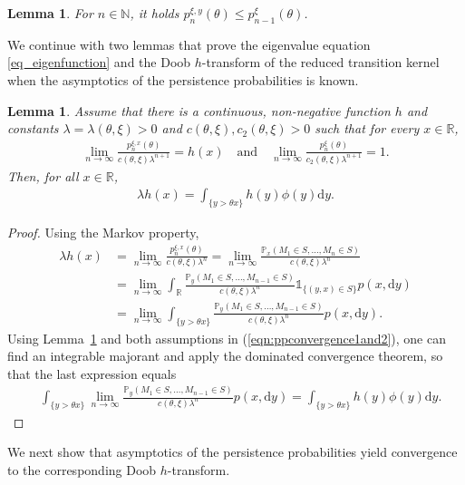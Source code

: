 \documentclass[12pt]{article}
\newcommand{\N}{\mathbb{N}} %
\newcommand{\R}{\mathbb{R}} %
\renewcommand{\P}{\mathbb{P}} %
\newcommand{\1}{\mathds{1}}
\renewcommand{\d}{\mathrm{d}}
\theoremstyle{definition}
\theoremstyle{plain}
\newtheorem{Lemma}[definition]{Lemma}
\theoremstyle{remark}
\begin{document}
\begin{Lemma}\label{estimate_Px}
For $n\in\N$, it holds 
$p_n^{\xi,y}(\theta)\le p_{n-1}^{\xi}(\theta)$.
\end{Lemma}
We continue with two lemmas that prove the eigenvalue equation \eqref{eq_eigenfunction} and the Doob $h$-transform of the reduced transition kernel when the asymptotics of the persistence probabilities is known.
\begin{Lemma}\label{eigenfunction_lemma}
  Assume that there is a continuous, non-negative function $h$ and constants $\lambda=\lambda(\theta,\xi)>0$ and $c(\theta,\xi),c_2(\theta,\xi)>0$ such that for  every $x\in\R$,
    \begin{align} \label{eqn:ppconvergence1and2}
        \lim_{n\to\infty}\frac{p_n^{\xi,x}(\theta)}{c(\theta,\xi)\lambda^{n+1}}= h(x)
   \quad\text{and}\quad
       \lim_{n\to\infty}\frac{p_n^{\xi}(\theta)}{c_2(\theta,\xi)\lambda^{n+1}}=1.
    \end{align}
 Then, for all $x\in\R$,
 \begin{align*}
     \lambda h(x)=\int_{\{y>\theta x\}}h(y)\phi(y)\d y.
 \end{align*}
\end{Lemma}
\begin{proof}
Using the Markov property,
  \begin{align*}
   \lambda h(x)&= \lim_{n\to\infty}\frac{p_n^{\xi,x}(\theta)}{c(\theta,\xi)\lambda ^n}
      =\lim_{n\to\infty}\frac{\P_x(M_1\in S,\dots,M_n\in S)}{c(\theta,\xi)\lambda ^n}
      \\&=\lim_{n\to\infty}\int_\R\frac{\P_y(M_1\in S,\dots,M_{n-1}\in S)}{c(\theta,\xi)\lambda ^n}\1_{\{(y,x)\in S\}}p(x,\d y)
      \\&=\lim_{n\to\infty}\int_{\{y>\theta x\}}\frac{\P_y(M_1\in S,\dots,M_{n-1}\in S)}{c(\theta,\xi)\lambda ^n}p(x,\d y).
    \end{align*}
    Using Lemma~\ref{estimate_Px} and both assumptions in (\ref{eqn:ppconvergence1and2}), one can find an integrable majorant and apply the dominated convergence theorem, so that the last expression equals
\begin{align*}
     &%
     \int_{\{y>\theta x\}}\lim_{n\to\infty}\frac{\P_y(M_1\in S,\dots,M_{n-1}\in S)}{c(\theta,\xi)\lambda ^n}p(x,\d y)
      =\!\int_{\{y>\theta x\}} h(y)\phi(y)\d y.\tag*{\qedhere}
\end{align*}
\end{proof}
We next show that  asymptotics of the persistence probabilities yield convergence to the corresponding Doob $h$-transform.
\end{document}
